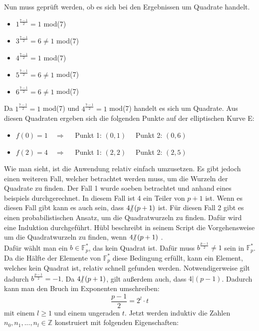 Nun muss geprüft werden, ob es sich bei den Ergebnissen um Quadrate handelt. 

\begin{itemize}
\item $1^{\frac{7 - 1}{2}} = 1$ mod(7)
\item $3^{\frac{7 - 1}{2}} = 6 \neq 1$ mod(7)
\item $4^{\frac{7 - 1}{2}} = 1$ mod(7)
\item $5^{\frac{7 - 1}{2}} = 6 \neq 1$ mod(7)
\item $6^{\frac{7 - 1}{2}} = 6 \neq 1$ mod(7)
\end{itemize} 

Da $1^{\frac{7 - 1}{2}} = 1$ mod(7) und $4^{\frac{7 - 1}{2}} = 1$ mod(7) handelt es sich um Quadrate. Aus diesen Quadraten ergeben sich die folgenden Punkte auf der elliptischen Kurve E:

\begin{itemize}
\item $f(0) = 1 \quad \Longrightarrow \quad$ Punkt 1: $(0, 1) \quad$ Punkt 2: $(0, 6)$
\item $f(2) = 4 \quad \Longrightarrow \quad$ Punkt 1: $(2, 2) \quad$ Punkt 2: $(2, 5)$
\end{itemize}

Wie man sieht, ist die Anwendung relativ einfach umzusetzen. Es gibt jedoch einen weiteren Fall, welcher betrachtet werden muss, um die Wurzeln der Quadrate zu finden. Der Fall 1 wurde soeben betrachtet und anhand eines beispiels durchgerechnet. In diesem Fall ist 4 ein Teiler von $p + 1$ ist. Wenn es diesen Fall gibt kann es auch sein, dass $4 \hspace{-0.4em}\not\hspace{0.025em}|\, (p + 1)$ ist. Für diesen Fall 2 gibt es einen probabilistischen Ansatz, um die Quadratwurzeln zu finden. Dafür wird eine Induktion durchgeführt. Hübl beschreibt in seinem Script die Vorgehensweise um die Quadratwurzeln zu finden, wenn $4 \hspace{-0.4em}\not\hspace{0.025em}|\, (p + 1)$ \cite[S. 270-272]{Dr.ReinholdHubl.2022}. \\

Dafür wählt man ein $b \in \mathbb{F}_p^*$, das kein Quadrat ist. Dafür muss $b^{\frac{p - 1}{2}} \neq 1$ sein in $\mathbb{F}_p^*$. Da die Hälfte der Elemente von $\mathbb{F}_p^*$ diese Bedingung erfüllt, kann ein Element, welches kein Quadrat ist, relativ schnell gefunden werden. Notwendigerweise gilt dadurch $b^{\frac{p - 1}{2}} = - 1$. Da $4 \hspace{-0.4em}\not\hspace{0.025em}|\, (p + 1)$, gilt außerdem auch, dass $4 | (p - 1)$. Dadurch kann man den Bruch im Exponenten umschreiben: $$\frac{p - 1}{2} = 2^l \cdot t$$ mit einem $l \geq 1$ und einem ungeraden $t$. Jetzt werden induktiv die Zahlen $n_0, n_1, ..., n_l \in \mathbb{Z}$ konstruiert mit folgenden Eigenschaften:

